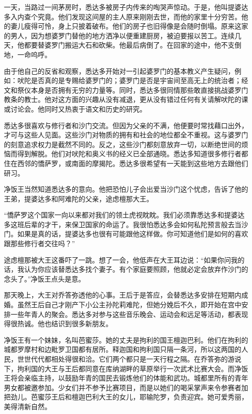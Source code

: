 \documentclass[12pt,twoside,openany]{book}
\begin{document}
一天，当路过一间茅房时，悉达多被房子内传来的啕哭声惊动。于是，他叫提婆达多入内查个究竟。他们发现这间屋的主人原来刚刚去世，而他的家里十分穷苦。他的妻儿瘦得可怜，身上只披着破布。他们的房子也旧得像是会随时倒塌。原来这家的男人，因为想婆罗门替他的地方洒净以便重建厨房，被迫要报以苦工。连续几天，他都要替婆罗门搬运大石和砍柴。他最后病倒了。在回家的途中，他不支倒地，一命呜呼。

由于他自己的反省和观察，悉达多开始对一引起婆罗门的基本教义产生疑问，例如：吠陀是否真的是专赐给婆罗门的；婆罗门是否是宇宙间至高无上的统治者；经文和祭仪本身是否拥有无穷的力量等。同时，悉达多很同情那些敢直接挑战婆罗门教条的教士。他对这方面的兴趣从没有减退，更从没有错过任何有关请解吠陀的课或讨论会。他同时又热衷于语文和历史的研究。

悉达多很喜欢与修行者和沙门交流。但因为父亲的不满，他便要时常找藉口出外，才可与这些人见面。这些沙门对物质的拥有和社会的地位都全不重视。这与婆罗门的刻意追求权力是截然不同的。反之，这些沙门都刻意放弃一切，以断绝世间的烦恼而得到解脱。他们对吠陀和奥义书的经义已全部通晓。悉达多知道很多修行者都住在西邻的憍萨罗，或南面的摩揭陀。悉达多很希望有一天能到这些地方去跟他们研习。

净饭王当然知道悉达多的意向。他把恐怕儿子会出爱当沙门这个忧虑，告诉了他的王弟，提婆达多和阿难陀的父亲，途虑檀那大王。

“憍萨罗这个国家一向以来都对我们的领土虎视眈眈。我们必须靠悉达多和提婆达多这班后辈的才干，来保卫国家的命运了。我很怕悉达多会如何私陀预言般去当沙门。如果是真的话，提婆达多也很有可能跟他这样做。你可知道他们是如何的喜欢跟那些修行者交往吗？”

途虑檀那被大王这番吓了一跳。想了一会，他低声在大王耳边说：“如果你问我的话，我认为你应该替悉达多找个妻子。有个家庭要照顾，他就必定会放弃作沙门的念头了。”净饭王点头是意。

那天晚上，大王对乔答弥透他的心事。王后于是答应，会替悉达多安排在短期内成婚。虽然王后自己才刚产下小公主孙陀莉难陀，但她分娩后不久，即开始在宫中安排一些年青人的聚会。悉达多对参与这些音乐晚会、运动会和远足等活动，都表现得很热诚。他也结识到很多新朋友。

净饭王有一个妹妹，名叫芭蜜莎。她的丈夫是拘利的国王檀迦巴利。他们在拘利的城都罗摩村和边毗罗卫国都有居所。释迦国和拘利国只隔一条河，所以这两国的人民，世世代代都相处得很和洽。它们两个都只是一天行程之隔。在乔答弥的游说下，拘利国的大王与王后都同意在库纳湖畔的草原举行一次武术比赛大会。而净饭王将会亲临主持，以鼓励年青的国民去锻炼他们的体能和武功。城都里所有的青年男女都被邀参加。少女们并不参予比赛项目，而是以她们的喝采掌声来令参赛者加把劲儿。芭蜜莎王后和檀迦巴利大王的女儿，耶输陀罗，负责迎宾。她可爱秀丽，美得清新自然。
\end{document}
